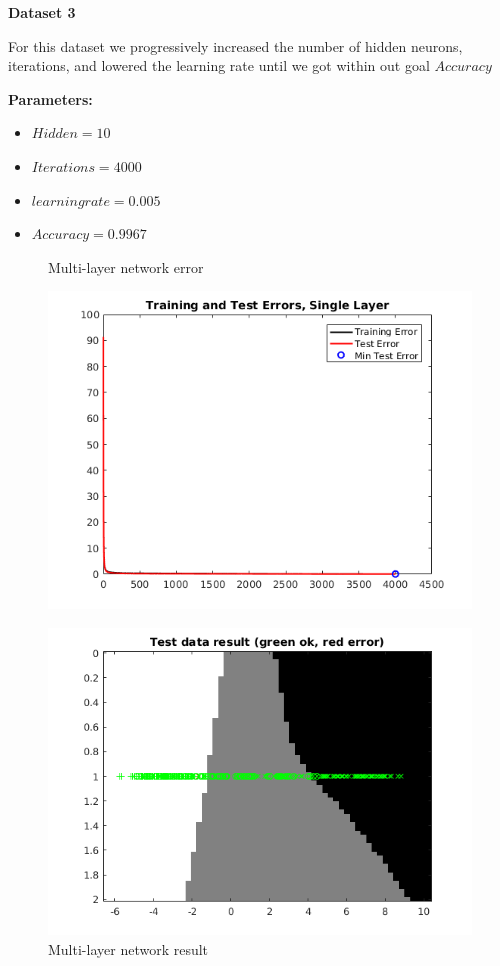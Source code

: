 \documentclass[a4paper,12pt]{article}
\begin{document}
\noindent \textbf{Dataset 3}

For this dataset we progressively increased the number of hidden neurons, iterations, and lowered the learning rate until we got within out goal $Accuracy$

\textbf{Parameters:}
\begin{itemize}
\item $Hidden = 10$
\item $Iterations = 4000$
\item $learning rate = 0.005$
\item $Accuracy = 0.9967$
\end{itemize}

\begin{figure}[H]
\centering
  \begin{minipage}[]{0.49\textwidth}
  \caption{Multi-layer network error}\label{fig:multi_3_error}
  \includegraphics[width=\textwidth]{figures/multi_3_error.png}
  \end{minipage}
  \begin{minipage}[]{0.49\textwidth}
  \caption{Multi-layer network result}\label{fig:multi_3_test}
  \includegraphics[width=\textwidth]{figures/multi_3_test.png}
  \end{minipage}
\end{figure}
\end{document}
